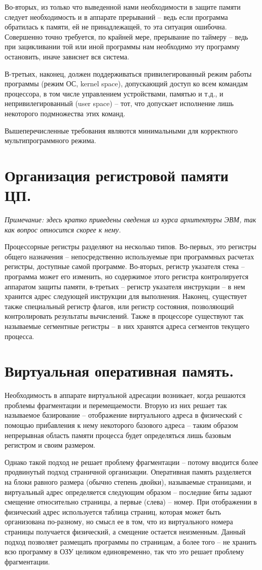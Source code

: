 \documentclass[a4paper,12pt,titlepage,finall]{article}
\begin{document}
Во-вторых, из только что выведенной нами необходимости в защите памяти следует необходимость и в аппарате прерываний -- ведь если программа обратилась к памяти, ей не принадлежащей, то эта ситуация ошибочна. Совершенно точно требуется, по крайней мере, прерывание по таймеру -- ведь при зацикливании той или иной программы нам необходимо эту программу остановить, иначе зависнет вся система.

В-третьих, наконец, должен поддерживаться привилегированный режим работы программы (режим ОС, kernel space), допускающий доступ ко всем командам процессора, в том числе управлением устройствами, памятью и т.д., и непривилегированный (user space) -- тот, что допускает исполнение лишь некоторого подмножества этих команд.

Вышеперечисленные требования являются минимальными для корректного мультипрограммного режима.
\section{Организация регистровой памяти ЦП.}
\textit{Примечание: здесь кратко приведены сведения из курса архитектуры ЭВМ, так как вопрос относится скорее к нему.}

Процессорные регистры разделяют на несколько типов. Во-первых, это регистры общего назначения -- непосредственно используемые при программных расчетах регистры, доступные самой программе. Во-вторых, регистр указателя стека -- программа может его изменить, но содержимое этого регистра контролируется аппаратом защиты памяти, в-третьих -- регистр указателя инструкции -- в нем хранится адрес следующей инструкции для выполнения. Наконец, существует также специальный регистр флагов, или регистр состояния, позволяющий контролировать результаты вычислений. Также в процессоре существуют так называемые сегментные регистры -- в них хранятся адреса сегментов текущего процесса.

\section{Виртуальная оперативная память.}
Необходимость в аппарате виртуальной адресации возникает, когда решаются проблемы фрагментации и перемещаемости. Вторую из них решает так называемое базирование -- отображение виртуального адреса в физический с помощью прибавления к нему некоторого базового адреса -- таким образом непрерывная область памяти процесса будет определяться лишь базовым регистром и своим размером.

Однако такой подход не решает проблему фрагментации -- потому вводится более продвинутый подход страничной организации. Оперативная память разделяется на блоки равного размера (обычно степень двойки), называемые страницами, и виртуальный адрес определяется следующим образом -- последние биты задают смещение относительно страницы, а первые (слева) -- номер. При отображении в физический адрес используется таблица страниц, которая может быть организована по-разному, но смысл ее в том, что из виртуального номера страницы получается физический, а смещение остается неизменным. Данный подход позволяет размещать программы по страницам, а более того -- не хранить всю программу в ОЗУ целиком единовременно, так что это решает проблему фрагментации.
\end{document}
